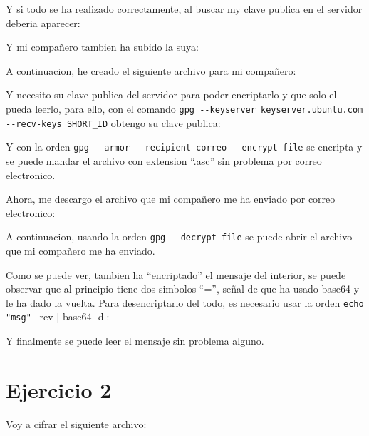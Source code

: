\documentclass{article}
\begin{document}

Y si todo se ha realizado correctamente, al buscar my clave publica en el servidor deberia aparecer:


Y mi compañero tambien ha subido la suya:



A continuacion, he creado el siguiente archivo para mi compañero:


Y necesito su clave publica del servidor para poder encriptarlo y que solo el pueda leerlo, para ello, con el comando \verb|gpg --keyserver keyserver.ubuntu.com --recv-keys SHORT_ID| obtengo su clave publica:


Y con la orden \verb|gpg --armor --recipient correo --encrypt file| se encripta y se puede mandar el archivo con extension ``.asc'' sin problema por correo electronico.


Ahora, me descargo el archivo que mi compañero me ha enviado por correo electronico:


A continuacion, usando la orden \verb|gpg --decrypt file| se puede abrir el archivo que mi compañero me ha enviado.


Como se puede ver, tambien ha ``encriptado'' el mensaje del interior, se puede observar que al principio tiene dos simbolos ``='', señal de que ha usado base64 y le ha dado la vuelta. Para desencriptarlo del todo, es necesario usar la orden \verb|echo "msg" | rev | base64 -d|:


Y finalmente se puede leer el mensaje sin problema alguno.

\section*{Ejercicio 2}

Voy a cifrar el siguiente archivo:
\end{document}
